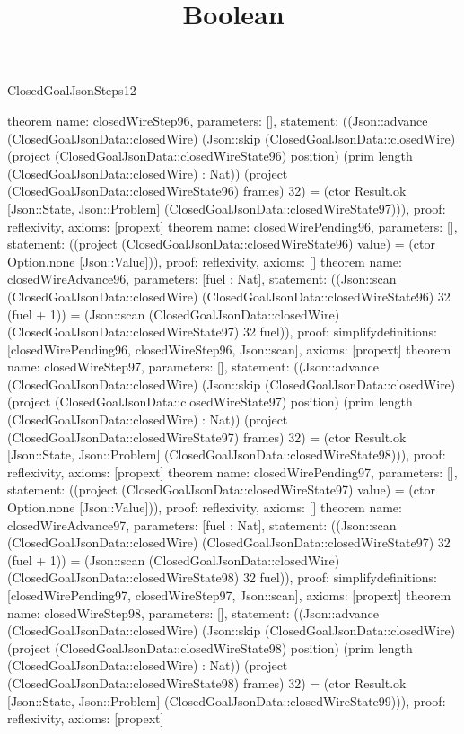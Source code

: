 \begin{lexlean}{ClosedGoalJsonSteps12}
\title{Boolean}
\begin{semanticmodule}
theorem{
 name: closedWireStep96, parameters: [],
 statement: ((Json::advance (ClosedGoalJsonData::closedWire) (Json::skip (ClosedGoalJsonData::closedWire) (project (ClosedGoalJsonData::closedWireState96) position) (prim length (ClosedGoalJsonData::closedWire) : Nat)) (project (ClosedGoalJsonData::closedWireState96) frames) 32) = (ctor Result.ok [Json::State, Json::Problem] (ClosedGoalJsonData::closedWireState97))), proof: reflexivity{}, axioms: [propext]
}
theorem{
 name: closedWirePending96, parameters: [],
 statement: ((project (ClosedGoalJsonData::closedWireState96) value) = (ctor Option.none [Json::Value])), proof: reflexivity{}, axioms: []
}
theorem{
 name: closedWireAdvance96, parameters: [fuel : Nat],
 statement: ((Json::scan (ClosedGoalJsonData::closedWire) (ClosedGoalJsonData::closedWireState96) 32 (fuel + 1)) = (Json::scan (ClosedGoalJsonData::closedWire) (ClosedGoalJsonData::closedWireState97) 32 fuel)), proof: simplify{definitions: [closedWirePending96, closedWireStep96, Json::scan]}, axioms: [propext]
}
theorem{
 name: closedWireStep97, parameters: [],
 statement: ((Json::advance (ClosedGoalJsonData::closedWire) (Json::skip (ClosedGoalJsonData::closedWire) (project (ClosedGoalJsonData::closedWireState97) position) (prim length (ClosedGoalJsonData::closedWire) : Nat)) (project (ClosedGoalJsonData::closedWireState97) frames) 32) = (ctor Result.ok [Json::State, Json::Problem] (ClosedGoalJsonData::closedWireState98))), proof: reflexivity{}, axioms: [propext]
}
theorem{
 name: closedWirePending97, parameters: [],
 statement: ((project (ClosedGoalJsonData::closedWireState97) value) = (ctor Option.none [Json::Value])), proof: reflexivity{}, axioms: []
}
theorem{
 name: closedWireAdvance97, parameters: [fuel : Nat],
 statement: ((Json::scan (ClosedGoalJsonData::closedWire) (ClosedGoalJsonData::closedWireState97) 32 (fuel + 1)) = (Json::scan (ClosedGoalJsonData::closedWire) (ClosedGoalJsonData::closedWireState98) 32 fuel)), proof: simplify{definitions: [closedWirePending97, closedWireStep97, Json::scan]}, axioms: [propext]
}
theorem{
 name: closedWireStep98, parameters: [],
 statement: ((Json::advance (ClosedGoalJsonData::closedWire) (Json::skip (ClosedGoalJsonData::closedWire) (project (ClosedGoalJsonData::closedWireState98) position) (prim length (ClosedGoalJsonData::closedWire) : Nat)) (project (ClosedGoalJsonData::closedWireState98) frames) 32) = (ctor Result.ok [Json::State, Json::Problem] (ClosedGoalJsonData::closedWireState99))), proof: reflexivity{}, axioms: [propext]
}
\end{semanticmodule}
\end{lexlean}
